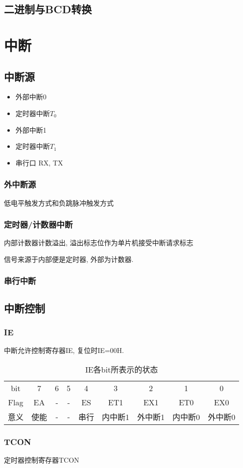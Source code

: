\documentclass[a4paper]{report}
\begin{document}
\section{二进制与BCD转换}
\chapter{中断}
\section{中断源}
\begin{itemize}
  \item 外部中断0
  \item 定时器中断$T_0$
  \item 外部中断1
  \item 定时器中断$T_1$
  \item 串行口 RX, TX
\end{itemize}
\subsection{外中断源}
低电平触发方式和负跳脉冲触发方式
\subsection{定时器/计数器中断}
内部计数器计数溢出, 溢出标志位作为单片机接受中断请求标志

信号来源于内部便是定时器, 外部为计数器. 
\subsection{串行中断}
\section{中断控制}
\subsection{IE}
中断允许控制寄存器IE, 复位时IE=00H. 
\begin{table}[H]
  \centering
  \begin{tabular}{c|cccccccc}
    bit & 7&6&5&4&3&2&1&0
    \\ Flag &EA&-&-&ES&ET1&EX1&ET0&EX0
    \\ 意义 &使能&-&-&串行&内中断1&外中断1&内中断0&外中断0
  \end{tabular}
  \caption{IE各bit所表示的状态}
  \label{tab:ie}
\end{table}
\subsection{TCON}
定时器控制寄存器TCON
\end{document}

